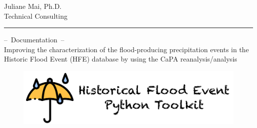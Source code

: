 \documentclass[10pt,a4paper,titlepage,parskip]{scrartcl}
\begin{document}
  
	
	\vspace*{-1cm}
	\pagestyle{fancy}
	
	\begin{center}
		Juliane Mai, Ph.D.\\
		Technical Consulting\\[4pt]
		{\rule{\linewidth}{0.4pt}}
	\end{center}
	\begin{center}
		\textcolor{myBlue}{{\Large --~Documentation~--}}\\[4pt]
		Improving the characterization of the flood-producing precipitation events in the Historic Flood Event (HFE) database by using the CaPA reanalysis/analysis\\[4pt]
	\end{center}

\vspace*{1cm}
\begin{figure}[h]
	\centering
	\includegraphics[width=0.85\linewidth]{logo/HFE_logo.png}
\end{figure}
\vspace*{1cm}
	
\tableofcontents
\pagebreak
\end{document}
